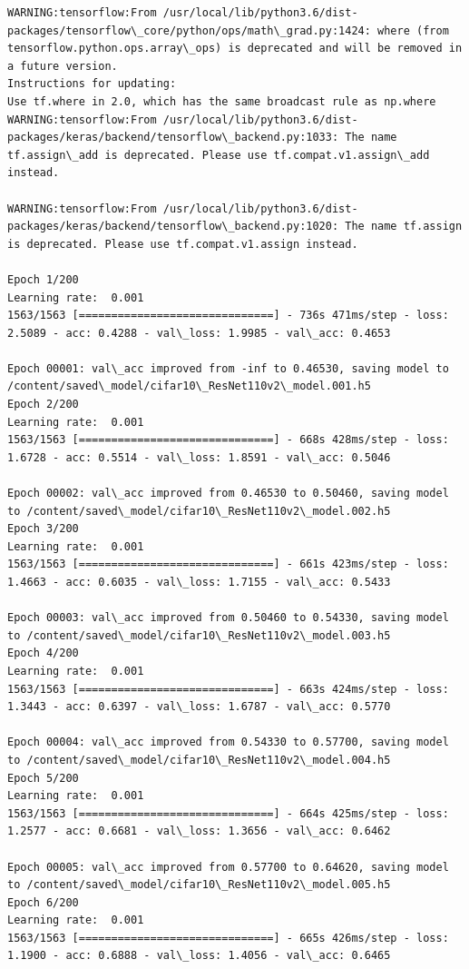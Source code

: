 \documentclass[11pt]{article}
\begin{document}
    \begin{Verbatim}[commandchars=\\\{\}]
WARNING:tensorflow:From /usr/local/lib/python3.6/dist-packages/tensorflow\_core/python/ops/math\_grad.py:1424: where (from tensorflow.python.ops.array\_ops) is deprecated and will be removed in a future version.
Instructions for updating:
Use tf.where in 2.0, which has the same broadcast rule as np.where
WARNING:tensorflow:From /usr/local/lib/python3.6/dist-packages/keras/backend/tensorflow\_backend.py:1033: The name tf.assign\_add is deprecated. Please use tf.compat.v1.assign\_add instead.

WARNING:tensorflow:From /usr/local/lib/python3.6/dist-packages/keras/backend/tensorflow\_backend.py:1020: The name tf.assign is deprecated. Please use tf.compat.v1.assign instead.

Epoch 1/200
Learning rate:  0.001
1563/1563 [==============================] - 736s 471ms/step - loss: 2.5089 - acc: 0.4288 - val\_loss: 1.9985 - val\_acc: 0.4653

Epoch 00001: val\_acc improved from -inf to 0.46530, saving model to /content/saved\_model/cifar10\_ResNet110v2\_model.001.h5
Epoch 2/200
Learning rate:  0.001
1563/1563 [==============================] - 668s 428ms/step - loss: 1.6728 - acc: 0.5514 - val\_loss: 1.8591 - val\_acc: 0.5046

Epoch 00002: val\_acc improved from 0.46530 to 0.50460, saving model to /content/saved\_model/cifar10\_ResNet110v2\_model.002.h5
Epoch 3/200
Learning rate:  0.001
1563/1563 [==============================] - 661s 423ms/step - loss: 1.4663 - acc: 0.6035 - val\_loss: 1.7155 - val\_acc: 0.5433

Epoch 00003: val\_acc improved from 0.50460 to 0.54330, saving model to /content/saved\_model/cifar10\_ResNet110v2\_model.003.h5
Epoch 4/200
Learning rate:  0.001
1563/1563 [==============================] - 663s 424ms/step - loss: 1.3443 - acc: 0.6397 - val\_loss: 1.6787 - val\_acc: 0.5770

Epoch 00004: val\_acc improved from 0.54330 to 0.57700, saving model to /content/saved\_model/cifar10\_ResNet110v2\_model.004.h5
Epoch 5/200
Learning rate:  0.001
1563/1563 [==============================] - 664s 425ms/step - loss: 1.2577 - acc: 0.6681 - val\_loss: 1.3656 - val\_acc: 0.6462

Epoch 00005: val\_acc improved from 0.57700 to 0.64620, saving model to /content/saved\_model/cifar10\_ResNet110v2\_model.005.h5
Epoch 6/200
Learning rate:  0.001
1563/1563 [==============================] - 665s 426ms/step - loss: 1.1900 - acc: 0.6888 - val\_loss: 1.4056 - val\_acc: 0.6465


\end{Verbatim}
\end{document}
